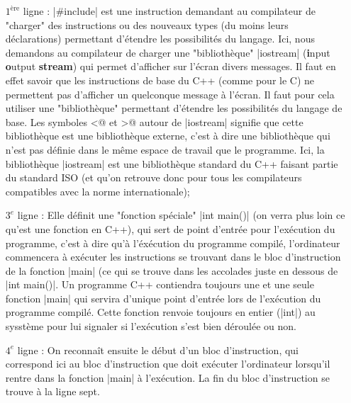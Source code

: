 \begin{itemize}
  \item[$1^{\mbox{ère}}$ ligne] : |#include| est une instruction demandant au compilateur de "charger" des instructions ou des nouveaux types (du moins leurs déclarations) permettant d'étendre les possibilités du langage. Ici, nous demandons au compilateur de charger une "bibliothèque" |iostream| (\textbf{i}nput \textbf{o}utput \textbf{stream}) qui permet d'afficher sur l'écran divers messages. Il faut en effet savoir que les instructions de base du C++ (comme pour le C) ne permettent pas d'afficher un quelconque message à l'écran. Il faut pour cela utiliser une "bibliothèque" permettant d'étendre les possibilités du langage de base. Les symboles \verb@<@ et \verb@>@ autour de |iostream| signifie que cette bibliothèque est une bibliothèque externe, c'est à dire une bibliothèque qui n'est pas définie dans le même espace de travail que le programme. Ici, la bibliothèque |iostream| est une bibliothèque standard du C++ faisant partie du standard ISO (et qu'on retrouve donc pour tous les compilateurs compatibles avec la norme internationale);
  \item[$3^{e}$ ligne] : Elle définit une "fonction spéciale" |int main()| (on verra plus loin ce qu'est une fonction en C++), qui sert de point d'entrée pour l'exécution du programme, c'est à dire qu'à l'éxécution du programme compilé, l'ordinateur commencera à exécuter les instructions se trouvant dans le bloc d'instruction de la fonction |main| (ce qui se trouve dans les accolades juste en dessous de |int main()|. Un programme C++ contiendra toujours une et une seule fonction |main| qui servira d'unique point d'entrée lors de l'exécution du programme compilé. Cette fonction renvoie toujours en entier (|int|)  au sysstème pour lui signaler si l'exécution s'est bien déroulée ou non.
  \item[$4^{e}$ ligne] : On reconnaît ensuite le début d'un bloc d'instruction, qui correspond ici au bloc d'instruction que doit exécuter l'ordinateur lorsqu'il rentre dans la fonction |main| à l'exécution. La fin du bloc d'instruction se trouve à la ligne sept.

\end{itemize}
